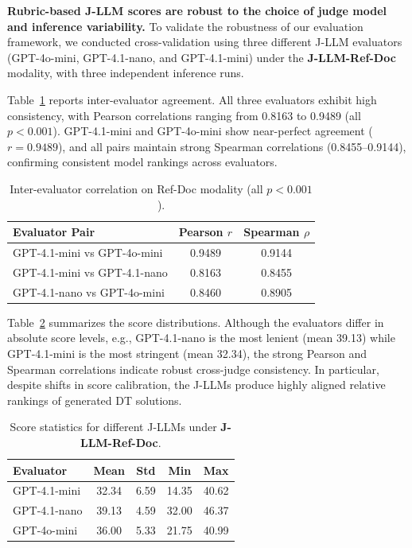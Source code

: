 \documentclass{ieeeaccess}
\begin{document}
\noindent\textbf{Rubric-based J-LLM scores are robust to the choice of judge model and inference variability.}
To validate the robustness of our evaluation framework, we conducted cross-validation using three different J-LLM evaluators (GPT-4o-mini, GPT-4.1-nano, and GPT-4.1-mini) under the \textbf{J-LLM-Ref-Doc} modality, with three independent inference runs.

Table~\ref{tab:jllm_correlation} reports inter-evaluator agreement. All three evaluators exhibit high consistency, with Pearson correlations ranging from 0.8163 to 0.9489 (all $p < 0.001$). GPT-4.1-mini and GPT-4o-mini show near-perfect agreement ($r = 0.9489$), and all pairs maintain strong Spearman correlations (0.8455--0.9144), confirming consistent model rankings across evaluators.

\begin{table}[htbp]
\centering
\caption{Inter-evaluator correlation on Ref-Doc modality (all $p < 0.001$).}
\label{tab:jllm_correlation}
\begin{tabular}{lcc}
\toprule
\textbf{Evaluator Pair} & \textbf{Pearson $r$} & \textbf{Spearman $\rho$} \\
\midrule
GPT-4.1-mini vs GPT-4o-mini & 0.9489 & 0.9144 \\
GPT-4.1-mini vs GPT-4.1-nano & 0.8163 & 0.8455 \\
GPT-4.1-nano vs GPT-4o-mini & 0.8460 & 0.8905 \\
\bottomrule
\end{tabular}
\end{table}

Table~\ref{tab:jllm_statistics} summarizes the score distributions. Although the evaluators differ in absolute score levels, e.g., GPT-4.1-nano is the most lenient (mean 39.13) while GPT-4.1-mini is the most stringent (mean 32.34), the strong Pearson and Spearman correlations indicate robust cross-judge consistency. In particular, despite shifts in score calibration, the J-LLMs produce highly aligned relative rankings of generated DT solutions.

\begin{table}[htbp]
\centering
\caption{Score statistics for different J-LLMs under \textbf{J-LLM-Ref-Doc}.}
\label{tab:jllm_statistics}
\begin{tabular}{lcccc}
\toprule
\textbf{Evaluator} & \textbf{Mean} & \textbf{Std} & \textbf{Min} & \textbf{Max} \\
\midrule
GPT-4.1-mini & 32.34 & 6.59 & 14.35 & 40.62 \\
GPT-4.1-nano & 39.13 & 4.59 & 32.00 & 46.37 \\
GPT-4o-mini  & 36.00 & 5.33 & 21.75 & 40.99 \\
\bottomrule
\end{tabular}
\end{table}
\end{document}
